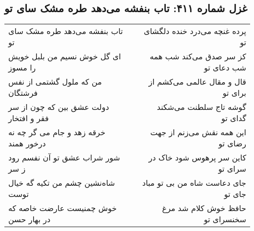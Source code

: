 \begin{center}
\section*{غزل شماره ۴۱۱: تاب بنفشه می‌دهد طره مشک سای تو}
\label{sec:sh411}
\begin{longtable}{l p{0.5cm} r}
تاب بنفشه می‌دهد طره مشک سای تو
&&
پرده غنچه می‌درد خنده دلگشای تو
\\
ای گل خوش نسیم من بلبل خویش را مسوز
&&
کز سر صدق می‌کند شب همه شب دعای تو
\\
من که ملول گشتمی از نفس فرشتگان
&&
قال و مقال عالمی می‌کشم از برای تو
\\
دولت عشق بین که چون از سر فقر و افتخار
&&
گوشه تاج سلطنت می‌شکند گدای تو
\\
خرقه زهد و جام می گر چه نه درخور همند
&&
این همه نقش می‌زنم از جهت رضای تو
\\
شور شراب عشق تو آن نفسم رود ز سر
&&
کاین سر پرهوس شود خاک در سرای تو
\\
شاه‌نشین چشم من تکیه گه خیال توست
&&
جای دعاست شاه من بی تو مباد جای تو
\\
خوش چمنیست عارضت خاصه که در بهار حسن
&&
حافظ خوش کلام شد مرغ سخنسرای تو
\\
\end{longtable}
\end{center}
